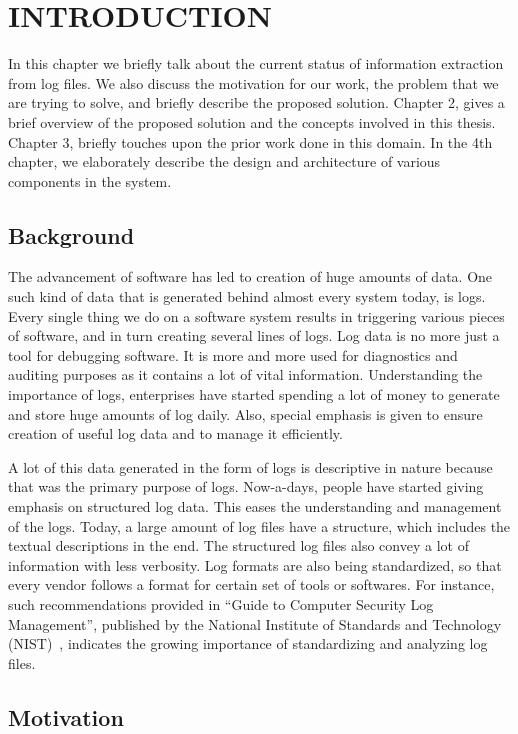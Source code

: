 \chapter{INTRODUCTION}
\thispagestyle{plain}

\label{Introduction}

In this chapter we briefly talk about the current status of information extraction from log files. We also discuss the motivation for our work, the problem that we are trying to solve, and briefly describe the proposed solution. Chapter 2, gives a brief overview of the proposed solution and the concepts involved in this thesis. Chapter 3, briefly touches upon the prior work done in this domain. In the 4th chapter, we elaborately describe the design and architecture of various components in the system.

\section{Background}

The advancement of software has led to creation of huge amounts of data. One such kind of data that is generated behind almost every system today, is logs. Every single thing we do on a software system results in triggering various pieces of software, and in turn creating several lines of logs. Log data is no more just a tool for debugging software. It is more and more used for diagnostics and auditing purposes as it contains a lot of vital information. Understanding the importance of logs, enterprises have started spending a lot of money to generate and store huge amounts of log daily. Also, special emphasis is given to ensure creation of useful log data and to manage it efficiently.

A lot of this data generated in the form of logs is descriptive in nature because that was the primary purpose of logs. Now-a-days, people have started giving emphasis on structured log data. This eases the understanding and management of the logs. Today, a large amount of log files have a structure, which includes the textual descriptions in the end. The structured log files also convey a lot of information with less verbosity. Log formats are also being standardized, so that every vendor follows a format for certain set of tools or softwares. For instance, such recommendations provided in ``Guide to Computer Security Log Management'', published by the National Institute of Standards and Technology (NIST)~\cite{nist_guide}, indicates the growing importance of standardizing and analyzing log files.

\section{Motivation}

